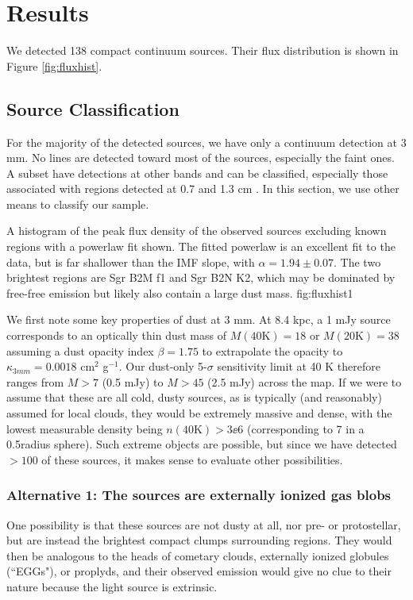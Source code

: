 \documentclass{emulateapj}
\newcommand{\ncores}{138\xspace}
\begin{document}
\section{Results}

We detected \ncores compact continuum sources.  Their flux distribution is
shown in Figure \ref{fig:fluxhist}.


\subsection{Source Classification}
For the majority of the detected sources, we have only a continuum detection at
3 mm.  No lines are detected toward most of the sources, especially the faint
ones.  A subset have detections at other bands and can be classified,
especially those associated with \hii regions detected at 0.7 and 1.3 cm
\citep{Gaume1995a,Mehringer1995b,de-Pree1996a,Pree2015a}.  In this section,
we use other means to classify our sample.

{A histogram of the peak flux density of the observed sources excluding known
\hii regions with a powerlaw fit shown.  The fitted powerlaw is an excellent
fit to the data, but is far shallower than the IMF slope, with
$\alpha=1.94\pm0.07$.  The two brightest regions are Sgr B2M f1 and Sgr B2N K2,
which may be dominated by free-free emission but likely also contain a large
dust mass.}
{fig:fluxhist}{1}{\textwidth}

We first note some key properties of dust at 3 mm.   At 8.4 kpc, a 1 mJy source
corresponds to an optically thin dust mass of $M(40\mathrm{K})=18$ \msun or
$M(20\mathrm{K})=38$ \msun assuming a dust opacity index $\beta=1.75$ to
extrapolate the \citet{Ossenkopf1994a} opacity to $\kappa_{3mm}=0.0018$ cm$^2$
g$^{-1}$.  Our dust-only 5-$\sigma$ sensitivity limit at 40 K therefore ranges
from $M>7$ \msun (0.5 mJy) to $M>45$ \msun (2.5 mJy) across the map.  If we
were to assume that these are all cold, dusty sources, as is typically (and
reasonably) assumed for local clouds, they would be extremely massive and
dense, with the lowest measurable density being $n(40\mathrm{K}) > 3\ee{6}$
\percc (corresponding to 7 \msun in a 0.5\arcsec radius sphere).  Such extreme
objects are possible, but since we have detected $>100$ of these sources, it
makes sense to evaluate other possibilities.


\subsubsection{Alternative 1: The sources are externally ionized gas blobs}
One possibility is that these sources are not dusty at all, nor pre- or
protostellar, but are instead the brightest compact clumps surrounding \hii
regions.  They would then be analogous to the heads of cometary clouds,
externally ionized globules (``EGGs"), or proplyds, and their observed emission
would give no clue to their nature because the light source is extrinsic.
\end{document}
